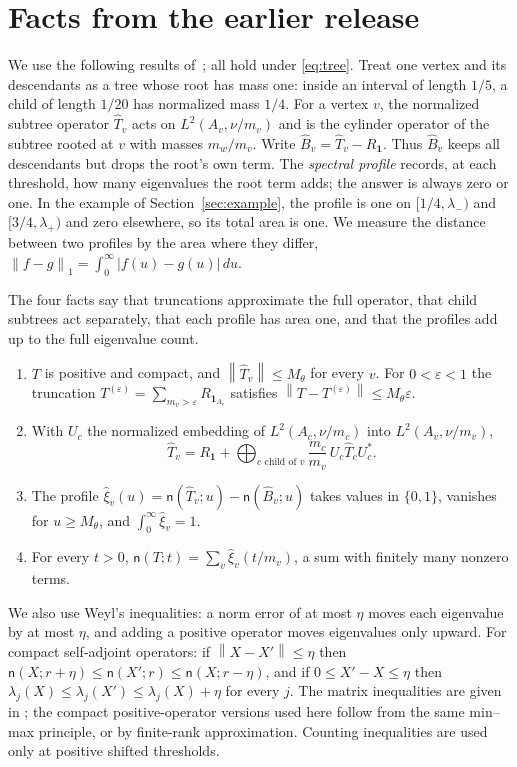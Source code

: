 \documentclass[11pt]{article}
\theoremstyle{definition}
\theoremstyle{remark}
\newcommand{\one}{\mathbf 1}
\newcommand{\ncount}{\mathsf n}
\newcommand{\norm}[1]{\left\lVert #1\right\rVert}
\begin{document}
\section{Facts from the earlier release}\label{sec:prelim}
We use the following results of~\cite{K26}; all hold under \eqref{eq:tree}.
Treat one vertex and its descendants as a tree whose root has mass one:
inside an interval of length $1/5$, a child of length $1/20$ has
normalized mass $1/4$. For a vertex $v$, the normalized subtree operator $\widehat T_v$ acts on
$L^2(A_v,\nu/m_v)$ and is the cylinder operator of the subtree rooted at
$v$ with masses $m_w/m_v$. Write $\widehat B_v=\widehat T_v-R_\one$.
Thus $\widehat B_v$ keeps all descendants but drops the root's own term.
The \emph{spectral profile} records, at each threshold, how many
eigenvalues the root term adds; the answer is always zero or one. In the
example of Section~\ref{sec:example}, the profile is one on
$[1/4,\lambda_-)$ and $[3/4,\lambda_+)$ and zero elsewhere, so its total
area is one. We measure the distance between two profiles by the area
where they differ, $\norm{f-g}_1=\int_0^\infty|f(u)-g(u)|\,du$.

The four facts say that truncations approximate the full operator, that
child subtrees act separately, that each profile has area one, and that
the profiles add up to the full eigenvalue count.

\begin{enumerate}
\item[(F1)] \cite[Prop.~3.1]{K26} $T$ is positive and compact, and
 $\norm{\widehat T_v}\le M_\theta$ for every $v$. For $0<\varepsilon<1$ the
 truncation $T^{(\varepsilon)}=\sum_{m_v>\varepsilon}R_{\one_{A_v}}$
 satisfies $\norm{T-T^{(\varepsilon)}}\le M_\theta\varepsilon$.
\item[(F2)] \cite[eq.~(13)]{K26} With $U_c$ the normalized embedding of
 $L^2(A_c,\nu/m_c)$ into $L^2(A_v,\nu/m_v)$,
 \[
 \widehat T_v=R_\one+\bigoplus_{c\text{ child of }v}\frac{m_c}{m_v}\,
 U_c\widehat T_cU_c^*.
 \]
\item[(F3)] \cite[Lemma~A.1 and eq.~(31)]{K26} The profile
 $\widehat\xi_v(u)=\ncount(\widehat T_v;u)-\ncount(\widehat B_v;u)$ takes
 values in $\{0,1\}$, vanishes for $u\ge M_\theta$, and
 $\int_0^\infty\widehat\xi_v=1$.
\item[(F4)] \cite[Prop.~A.2]{K26} For every $t>0$,
 $\ncount(T;t)=\sum_v\widehat\xi_v(t/m_v)$, a sum with finitely many nonzero
 terms.
\end{enumerate}
We also use Weyl's inequalities: a norm error of at most $\eta$ moves
each eigenvalue by at most $\eta$, and adding a positive operator moves
eigenvalues only upward. For compact self-adjoint operators: if
$\norm{X-X'}\le\eta$ then
$\ncount(X;r+\eta)\le\ncount(X';r)\le\ncount(X;r-\eta)$, and if
$0\le X'-X\le\eta$ then $\lambda_j(X)\le\lambda_j(X')\le\lambda_j(X)+\eta$
for every $j$. The matrix inequalities are given in
\cite[Section~III.2]{Bhatia}; the compact positive-operator versions used
here follow from the same min--max principle, or by finite-rank
approximation. Counting inequalities are used only at positive shifted
thresholds.
\end{document}
